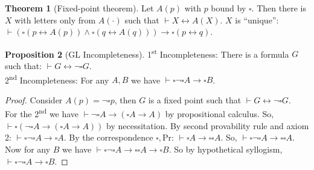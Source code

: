 \documentclass[a4paper,10pt]{article}
\theoremstyle{definition}
\newtheorem{theorem}{Theorem}
\newtheorem{proposition}[theorem]{Proposition}
\newcommand{\proves}{\vdash}
\begin{document}
\begin{theorem}[Fixed-point theorem]
    Let $A(p)$ with $p$ bound by $\square$. Then there is $X$ with letters only from $A(\cdot)$ such that $\proves X \leftrightarrow A(X)$. $X$ is ``unique'': $\proves (\square(p \leftrightarrow A(p)) \land \square(q \leftrightarrow A(q))) \rightarrow \square (p \leftrightarrow q)$.
\end{theorem}

\begin{proposition}[GL Incompleteness]
    1\textsuperscript{st} Incompleteness: There is a formula $G$ such that: $\proves G \leftrightarrow \neg \square G$.\\
    2\textsuperscript{nd} Incompleteness: For any $A, B$ we have $\proves \square \neg \square A \rightarrow \square B$.
\end{proposition}

\begin{proof}
    Consider $A(p) = \neg \square p$, then $G$ is a fixed point such that $\proves G \leftrightarrow \neg \square G$.\\
    For the 2\textsuperscript{nd} we have $\proves \neg \square A \rightarrow (\square A \rightarrow A)$ by propositional calculus. So, $\proves \square (\neg \square A \rightarrow (\square A \rightarrow A))$ by necessitation. By second provability rule and axiom 2:  $\proves \square \neg \square A \rightarrow \square A$.
    By the correspondence $\square, \mathrm{Pr}$: $\proves \square A \rightarrow \square \square A$. So, $\proves \square \neg \square A \rightarrow \square \square A$. Now for any $B$ we have $\proves \square \neg \square A \rightarrow \square \square A \rightarrow \square B$. So by hypothetical syllogism, $\proves \square \neg \square A \rightarrow \square B$.
\end{proof}
\end{document}
